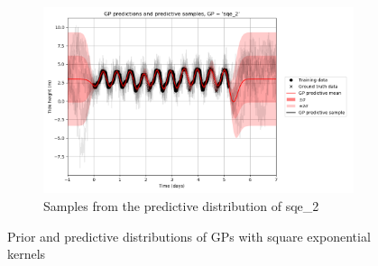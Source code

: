 \documentclass{article}
\begin{document}
\begin{figure}[pht]
\begin{subfigure}{0.45\textwidth}
        \includegraphics[width=\textwidth]{GP_predictions_and_predictive_samples,_GP____sqe_2_.png}
        \caption{Samples from the predictive distribution of sqe\_2}
        \label{fig:pred_samples_sqe_2}
    \end{subfigure}

    \caption{Prior and predictive distributions of GPs with square exponential kernels}
    \label{fig:sqe}
\end{figure}

\end{document}
